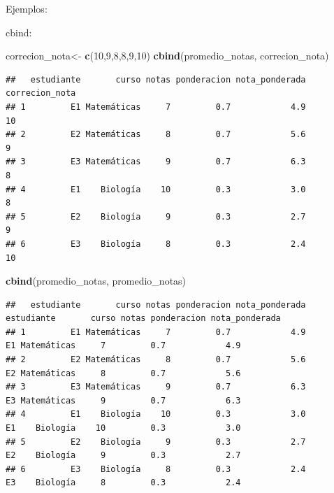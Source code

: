 \documentclass[
]{book}
\newenvironment{Shaded}{\begin{snugshade}}{\end{snugshade}}
\newcommand{\DecValTok}[1]{\textcolor[rgb]{0.00,0.00,0.81}{#1}}
\newcommand{\FunctionTok}[1]{\textcolor[rgb]{0.13,0.29,0.53}{\textbf{#1}}}
\newcommand{\NormalTok}[1]{#1}
\newcommand{\OtherTok}[1]{\textcolor[rgb]{0.56,0.35,0.01}{#1}}
\begin{document}
Ejemplos:

cbind:

\begin{Shaded}
\begin{Highlighting}[]
\NormalTok{correcion\_nota}\OtherTok{\textless{}{-}} \FunctionTok{c}\NormalTok{(}\DecValTok{10}\NormalTok{,}\DecValTok{9}\NormalTok{,}\DecValTok{8}\NormalTok{,}\DecValTok{8}\NormalTok{,}\DecValTok{9}\NormalTok{,}\DecValTok{10}\NormalTok{)}
\FunctionTok{cbind}\NormalTok{(promedio\_notas, correcion\_nota)}
\end{Highlighting}
\end{Shaded}

\begin{verbatim}
##   estudiante       curso notas ponderacion nota_ponderada correcion_nota
## 1         E1 Matemáticas     7         0.7            4.9             10
## 2         E2 Matemáticas     8         0.7            5.6              9
## 3         E3 Matemáticas     9         0.7            6.3              8
## 4         E1    Biología    10         0.3            3.0              8
## 5         E2    Biología     9         0.3            2.7              9
## 6         E3    Biología     8         0.3            2.4             10
\end{verbatim}

\begin{Shaded}
\begin{Highlighting}[]
\FunctionTok{cbind}\NormalTok{(promedio\_notas, promedio\_notas)}
\end{Highlighting}
\end{Shaded}

\begin{verbatim}
##   estudiante       curso notas ponderacion nota_ponderada estudiante       curso notas ponderacion nota_ponderada
## 1         E1 Matemáticas     7         0.7            4.9         E1 Matemáticas     7         0.7            4.9
## 2         E2 Matemáticas     8         0.7            5.6         E2 Matemáticas     8         0.7            5.6
## 3         E3 Matemáticas     9         0.7            6.3         E3 Matemáticas     9         0.7            6.3
## 4         E1    Biología    10         0.3            3.0         E1    Biología    10         0.3            3.0
## 5         E2    Biología     9         0.3            2.7         E2    Biología     9         0.3            2.7
## 6         E3    Biología     8         0.3            2.4         E3    Biología     8         0.3            2.4
\end{verbatim}
\end{document}

